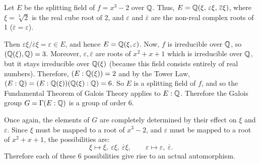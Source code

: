 \begin{example}
	Let $E$ be the splitting field of $f = x^3 - 2$ over $\mathbb{Q}$. Thus, $E = \mathbb{Q}(\xi,\, \varepsilon \xi,\, \overline{\varepsilon} \xi)$, where $\xi = \sqrt[3]{2}$ is the real cube root of 2, and $\varepsilon$ and $\overline{\varepsilon}$ are the non-real complex roots of 1 ($\overline{\varepsilon} = \varepsilon$).
	
	Then $\varepsilon \xi / \overline{\varepsilon} \xi = \varepsilon \in E$, and hence $E = \mathbb{Q}(\xi, \varepsilon)$. Now, $f$ is irreducible over $\mathbb{Q}$, so $(\mathbb{Q}(\xi), \mathbb{Q}) = 3$. Moreover, $\varepsilon, \overline{\varepsilon}$ are roots of $x^2 + x + 1$ which is irreducible over $\mathbb{Q}$, but it stays irreducible over $\mathbb{Q}(\xi)$ (because this field consists entirely of real numbers). Therefore, $(E : \mathbb{Q}(\xi)) = 2$ and by the Tower Law, $(E : \mathbb{Q}) = (E : \mathbb{Q}(\xi))(\mathbb{Q}(\xi) : \mathbb{Q}) = 6$. So $E$ is a splitting field of $f$, and so the Fundamental Theorem of Galois Theory applies to $E : \mathbb{Q}$. Therefore the Galois group $G = \Gamma(E : \mathbb{Q})$ is a group of order 6.
	
	Once again, the elements of $G$ are completely determined by their effect on $\xi$ and $\varepsilon$. Since $\xi$ must be mapped to a root of $x^3 - 2$, and $\varepsilon$ must be mapped to a root of $x^2 + x + 1$, the possibilities are:
	\[
		\xi \mapsto \xi,\ \varepsilon \xi,\ \overline{\varepsilon} \xi, \qquad \varepsilon \mapsto \varepsilon,\ \overline{\varepsilon}.
	\]
	Therefore each of these 6 possibilities give rise to an actual automorphism.
	

\end{example}
